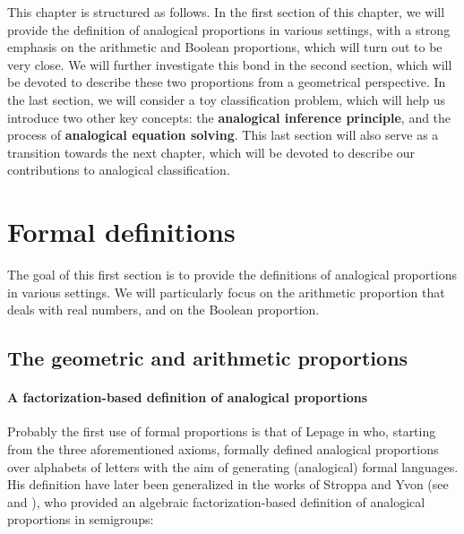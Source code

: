 This chapter is structured as follows. In the first section of this chapter, we
will provide the definition of analogical proportions in various settings, with
a strong emphasis on the arithmetic and Boolean proportions, which will turn
out to be very close. We will further investigate this bond in the second
section, which will be devoted to describe these two proportions from a
geometrical perspective. In the last section, we will consider a toy
classification problem, which will help us introduce two other key concepts:
the \textbf{analogical inference principle}, and the process of
\textbf{analogical equation solving}. This last section will also serve as a
transition towards the next chapter, which will be devoted to describe our
contributions to analogical classification.

\section{Formal definitions}
\label{SEC:formal_definitions_proportions}

The goal of this first section is to provide the definitions of analogical
proportions in various settings. We will particularly focus on the arithmetic
proportion that deals with real numbers, and on the Boolean proportion.

\subsection{The geometric and arithmetic proportions}

\paragraph{A factorization-based definition of analogical proportions\\}

Probably the first use of formal proportions is that of Lepage in \cite{Lep04}
who, starting from the three aforementioned axioms, formally defined analogical
proportions over alphabets of letters with the aim of generating (analogical)
formal languages. His definition have later been generalized in the works of
Stroppa and Yvon (see \cite{StrYvoCNLL05} and \cite{StrYvoREPORT05}), who
provided an algebraic factorization-based definition of analogical proportions
in semigroups:

